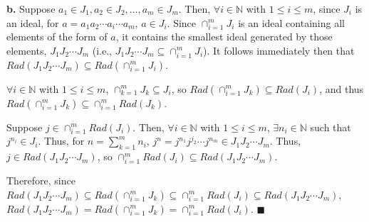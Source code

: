\documentclass{article}%
\begin{document}
\textbf{b.} Suppose $a_1 \in J_1, a_2 \in J_2, \ldots, a_m \in J_m$. Then,
$\forall i \in \mathbb{N}$ with $1 \leq i \leq m$, since $J_i$ is an ideal,
for $a = a_1a_2\cdots a_i \cdots a_m$, $a \in J_i$. Since $\cap_{i = 1}^m
J_i$ is an ideal containing all elements of the form of $a$, it contains the
smallest ideal generated by those elements, $J_1J_2\cdots J_m$ (i.e.,
$J_1J_2\cdots J_m \subseteq \cap_{i = 1}^m J_i$). It follows immediately then
that $Rad(J_1J_2\cdots J_m) \subseteq Rad(\cap_{i = 1}^m J_i)$.

$\forall i \in \mathbb{N}$ with $1 \leq i \leq m$, $\cap_{k = 1}^m J_k
\subseteq J_i$, so $Rad(\cap_{i = 1}^m J_k) \subseteq Rad(J_i)$,
and thus $Rad(\cap_{i = 1}^m J_k) \subseteq \cap_{i = 1}^m Rad(J_k)$.

Suppose $j \in \cap_{i = 1}^m Rad(J_i)$. Then, $\forall i \in \mathbb{N}$ with
$1 \leq i \leq m$, $\exists n_i \in \mathbb{N}$ such that $j^{n_i} \in J_i$.
Thus, for $n = \sum_{k = 1}^m n_i$, $j^n = j^{n_1}j^{j_2}\cdots j^{n_m} \in
J_1J_2\cdots J_m$. Thus, $j \in Rad(J_1J_2\cdots J_m)$, so
$\cap_{i = 1}^m Rad(J_i) \subseteq Rad(J_1J_2\cdots J_m)$.

Therefore, since $Rad(J_1J_2\cdots J_m) \subseteq Rad(\cap_{i = 1}^m J_k)
\subseteq \cap_{i = 1}^m Rad(J_i)
\subseteq Rad(J_1J_2\cdots J_m)$,
$Rad(J_1J_2\cdots J_m) = Rad(\cap_{i = 1}^m J_k) = \cap_{i = 1}^m Rad(J_i)$.
\qquad $\blacksquare$
\end{document}
